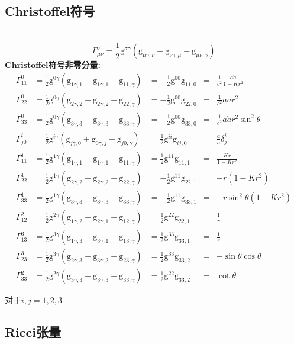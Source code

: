 \documentclass[14pt]{article}
\newcommand{\csg}[2]{\Gamma^{#1}_{#2}}
\newcommand{\g}{\mathrm{g}}
\newcommand{\csge}[3]{\frac{1}{2} \mathrm{g}^{#1\gamma}(\mathrm{g}_{#2\gamma, #3}+\mathrm{g}_{#3 \gamma,#2}-\mathrm{g}_{#2 #3,\gamma})}
\begin{document}
\subsection{Christoffel符号}
\quad\\

\[
\csg{\sigma}{\mu\nu}=\csge{\sigma}{\mu}{\nu}\tag{1.2.1}
\]
\textbf{Christoffel符号非零分量:}
\begin{align*}
\csg{0}{11} &= \csge{0}{1}{1}&= -\frac{1}{2}\g^{00}\g_{11,0}&=& \frac{1}{c^{2}}\frac{a\Dot{a}}{1-Kr^{2}}\tag{1.2.2}\\
\csg{0}{22} &= \csge{0}{2}{2}&= -\frac{1}{2}\g^{00}\g_{22,0}&=& \frac{1}{c^{2}}a\Dot{a}r^{2}\tag{1.2.3}\\
\csg{0}{33} &= \csge{0}{3}{3}&= -\frac{1}{2}\g^{00}\g_{33,0}&=& \frac{1}{c^{2}}a\Dot{a}r^{2}\sin^{2}\theta\tag{1.2.4}\\
\csg{i}{j0} &= \csge{i}{j}{0}  &= \frac{1}{2}\g^{ii}\g_{ij,0}&=& \frac{\Dot{a}}{a}\delta^{i}_{j}\tag{1.2.5}\\
\csg{1}{11} &= \csge{1}{1}{1}  &= \frac{1}{2}\g^{11}\g_{11,1}&=& \frac{Kr}{1-Kr^{2}}\tag{1.2.6}\\
\csg{1}{22} &= \csge{1}{2}{2} &= -\frac{1}{2}\g^{11}\g_{22,1}&=& -r(1-Kr^{2}) \tag{1.2.7}\\   
\csg{1}{33} &= \csge{1}{3}{3} &= -\frac{1}{2}\g^{11}\g_{33,1}&=& -r\sin^{2}\theta(1-Kr^{2}) \tag{1.2.8}\\  
\csg{2}{12} &=  \csge{2}{1}{2} &= \frac{1}{2}\g^{22}\g_{22,1}&=& \frac{1}{r} \tag{1.2.9}\\
\csg{3}{13} &= \csge{3}{1}{3}  &= \frac{1}{2}\g^{33}\g_{33,1}&=& \frac{1}{r}  \tag{1.2.10}\\ 
\csg{3}{23} &= \csge{3}{2}{3}  &= \frac{1}{2}\g^{33}\g_{33,2}&=& -\sin \theta \cos \theta  \tag{1.2.11}\\
\csg{2}{33} &= \csge{2}{3}{3}  &= \frac{1}{2}\g^{22}\g_{33,2}&= &\cot \theta  \tag{1.2.12}
\end{align*}

对于\(i,j=1,2,3\)
\subsection{Ricci张量}
\end{document}
